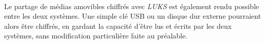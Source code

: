 \paragraph{}
Le partage de médias amovibles chiffrés avec \textit{LUKS} est également rendu
possible entre les deux systèmes. Une simple clé USB ou un disque dur externe
pourraient alors être chiffrés, en gardant la capacité d'être lus et écrits par
les deux systèmes, sans modification particulière faite au préalable.
